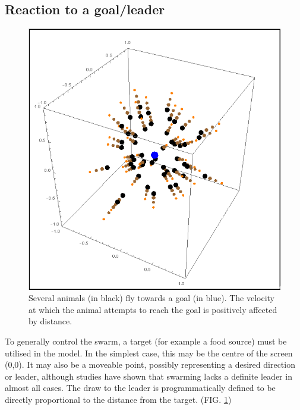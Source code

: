 \documentclass[
reprint,
showpacs,
preprintnumbers,
bibnotes,
amsmath,
amssymb,
aps,
pra,
floatfix,
]{revtex4-1}
\begin{document}
\subsection{\label{sec:leaderattraction}Reaction to a goal/leader}

\begin{figure}[!htp]
	\includegraphics[width=0.65\linewidth]{images/leader.png}

	\caption{
		Several animals (in black) fly towards a goal (in blue).
		The velocity at which the animal attempts to reach the goal is positively affected by distance.
	}

	\label{fig:boidleader}
\end{figure}

To generally control the swarm, a target (for example a food source) must be utilised in the model.
In the simplest case, this may be the centre of the screen (0,0).
It may also be a moveable point, possibly representing a desired direction or leader, although studies have shown that swarming lacks a definite leader in almost all cases.\cite{modellingflocks}
The draw to the leader is programmatically defined to be directly proportional to the distance from the target. (FIG. \ref{fig:boidleader})
\end{document}
